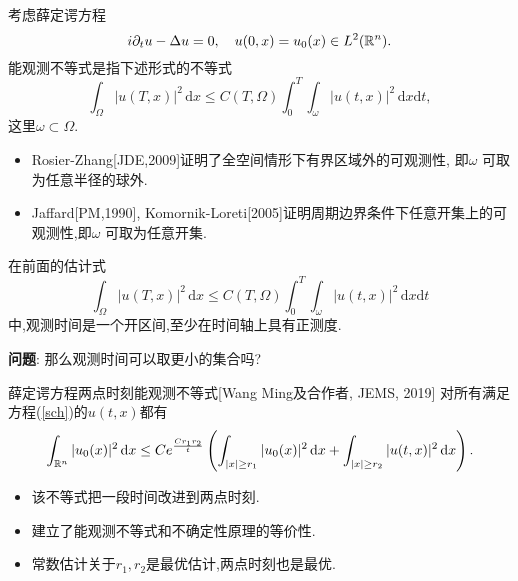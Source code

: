 \begin{frame}[t]
  考虑薛定谔方程 
  \begin{equation}\label{sch}
    i\partial_t u -\Delta u=0,\quad u(0,x)=u_0(x)\in L^2(\mathbb{R}^{n}).
  \end{equation}
 能观测不等式是指下述形式的不等式
 \begin{equation}
   \int_{\Omega}|u(T,x)|^2\,\mathrm{d}x\le C(T,\Omega)\int_{0}^{T}\int_{\omega}|u(t,x)|^2\,\mathrm{d}x\mathrm{d}t,
 \end{equation}
 这里$\omega\subset \Omega$.
 \begin{itemize}
   \item Rosier-Zhang[JDE,2009]证明了全空间情形下有界区域外的可观测性, 即$\omega$ 可取为任意半径的球外.
   \item Jaffard[PM,1990], Komornik-Loreti[2005]证明周期边界条件下任意开集上的可观测性,即$\omega$ 可取为任意开集.
 \end{itemize}
\end{frame}
\begin{frame}[t]
  在前面的估计式 
 \begin{equation*}
   \int_{\Omega}|u(T,x)|^2\,\mathrm{d}x\le C(T,\Omega)\int_{0}^{T}\int_{\omega}|u(t,x)|^2\,\mathrm{d}x\mathrm{d}t
 \end{equation*}
 中,观测时间是一个开区间,至少在时间轴上具有正测度.
 
 \textbf{问题}: 那么观测时间可以取更小的集合吗?


  \begin{alertblock}{薛定谔方程两点时刻能观测不等式[Wang Ming及合作者, JEMS, 2019]} 
    对所有满足方程(\ref{sch})的$u(t,x)$都有
  \begin{equation}\label{obsch}
    \int_{\mathbb{R}^{n}}|u_0(x)|^2\,\mathrm{d}x\le Ce^{\frac{Cr_1 r_2}{t}}\left( \int_{|x|\ge r_1}|u_0(x)|^2\,\mathrm{d}x+\int_{|x|\ge r_2}|u(t,x)|^2 \,\mathrm{d}x \right).
  \end{equation}
  \end{alertblock}
  \begin{itemize}
    \item 该不等式把一段时间改进到两点时刻.
    \item 建立了能观测不等式和不确定性原理的等价性.
    \item 常数估计关于$r_1,r_2$是最优估计,两点时刻也是最优.
  \end{itemize}
\end{frame}


